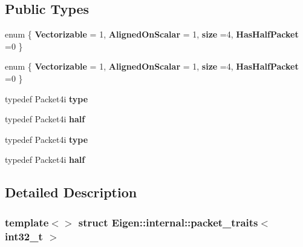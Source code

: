 \subsection*{Public Types}
\begin{DoxyCompactItemize}
\item 
\mbox{\label{struct_eigen_1_1internal_1_1packet__traits_3_01int32__t_01_4_a989301c66568675442218e7a193f3cd5}} 
enum \{ {\bfseries Vectorizable} = 1, 
{\bfseries Aligned\+On\+Scalar} = 1, 
{\bfseries size} =4, 
{\bfseries Has\+Half\+Packet} =0
 \}
\item 
\mbox{\label{struct_eigen_1_1internal_1_1packet__traits_3_01int32__t_01_4_a518466d6207875bf62bfa0f8a63d4f0b}} 
enum \{ {\bfseries Vectorizable} = 1, 
{\bfseries Aligned\+On\+Scalar} = 1, 
{\bfseries size} =4, 
{\bfseries Has\+Half\+Packet} =0
 \}
\item 
\mbox{\label{struct_eigen_1_1internal_1_1packet__traits_3_01int32__t_01_4_a95a9e2ef8a70b73583b20c8835f1e9e2}} 
typedef Packet4i {\bfseries type}
\item 
\mbox{\label{struct_eigen_1_1internal_1_1packet__traits_3_01int32__t_01_4_a430890b77e280a93bf22dd7bda3df6a4}} 
typedef Packet4i {\bfseries half}
\item 
\mbox{\label{struct_eigen_1_1internal_1_1packet__traits_3_01int32__t_01_4_a95a9e2ef8a70b73583b20c8835f1e9e2}} 
typedef Packet4i {\bfseries type}
\item 
\mbox{\label{struct_eigen_1_1internal_1_1packet__traits_3_01int32__t_01_4_a430890b77e280a93bf22dd7bda3df6a4}} 
typedef Packet4i {\bfseries half}
\end{DoxyCompactItemize}


\subsection{Detailed Description}
\subsubsection*{template$<$$>$\newline
struct Eigen\+::internal\+::packet\+\_\+traits$<$ int32\+\_\+t $>$}



